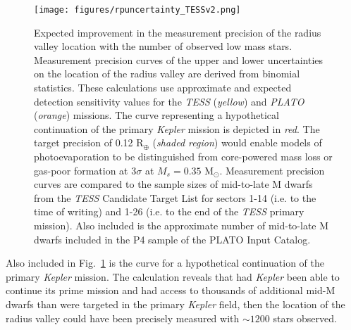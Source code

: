 \documentclass[twocolumn]{emulateapj}
\newcommand{\kepler}[1]{\emph{Kepler}#1}
\newcommand{\tess}[1]{\emph{TESS}#1}
\newcommand{\plato}[1]{\emph{PLATO}#1}
\begin{document}
\begin{figure}
  \centering
  \texttt{[image: figures/rpuncertainty\_TESSv2.png]}
  \caption{Expected improvement in the measurement precision of the radius valley location with the number of observed
    low mass stars. Measurement precision curves of the upper and lower uncertainties on the location of the radius valley 
    are derived from binomial statistics. These calculations use approximate and expected detection sensitivity
    values for the \tess{} (\emph{yellow}) and \plato{} (\emph{orange}) missions. The curve representing a hypothetical continuation
    of the primary \kepler{} mission is depicted in \emph{red}. The target precision of 0.12 R$_{\oplus}$ (\emph{shaded region})
    would enable models of photoevaporation to be distinguished from core-powered mass loss or gas-poor formation at $3\sigma$
    at $M_s=0.35$ M$_{\odot}$. Measurement precision curves are compared to the sample sizes of mid-to-late M dwarfs from the \tess{}
    Candidate Target List for sectors 1-14 (i.e. to the time of writing) and 1-26 (i.e. to the end of the \tess{} primary
    mission). Also included is the approximate number of mid-to-late M dwarfs included in the P4 sample of the
    PLATO Input Catalog.}
  \label{fig:improve}
\end{figure}

Also included in Fig.~\ref{fig:improve} is the curve for a hypothetical continuation of the primary \kepler{} mission.
The calculation reveals that had \kepler{} been able to continue its prime mission and had
access to thousands of additional mid-M dwarfs than were targeted in the primary \kepler{} field, then the location
of the radius valley could have been precisely measured with $\sim 1200$ stars observed.
\end{document}
